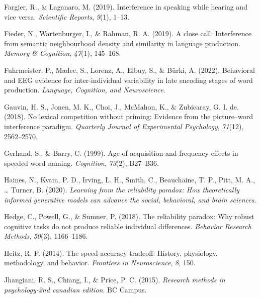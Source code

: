 \documentclass[
  man,floatsintext]{apa6}
\newlength{\cslhangindent}
\newlength{\cslentryspacingunit} %
\newenvironment{CSLReferences}[2] %
 {%
  \setlength{\parindent}{0pt}
  \ifodd #1
  \let\oldpar\par
  \def\par{\hangindent=\cslhangindent\oldpar}
  \fi
  \setlength{\parskip}{#2\cslentryspacingunit}
 }%
 {}
\begin{document}
\begin{CSLReferences}{1}{0}
\leavevmode{}%
Fargier, R., \& Laganaro, M. (2019). Interference in speaking while hearing and vice versa. \emph{Scientific Reports}, \emph{9}(1), 1--13.

\leavevmode{}%
Fieder, N., Wartenburger, I., \& Rahman, R. A. (2019). A close call: Interference from semantic neighbourhood density and similarity in language production. \emph{Memory \& Cognition}, \emph{47}(1), 145--168.

\leavevmode{}%
Fuhrmeister, P., Madec, S., Lorenz, A., Elbuy, S., \& Bürki, A. (2022). Behavioral and EEG evidence for inter-individual variability in late encoding stages of word production. \emph{Language, Cognition, and Neuroscience}.

\leavevmode{}%
Gauvin, H. S., Jonen, M. K., Choi, J., McMahon, K., \& Zubicaray, G. I. de. (2018). No lexical competition without priming: Evidence from the picture--word interference paradigm. \emph{Quarterly Journal of Experimental Psychology}, \emph{71}(12), 2562--2570.

\leavevmode{}%
Gerhand, S., \& Barry, C. (1999). Age-of-acquisition and frequency effects in speeded word naming. \emph{Cognition}, \emph{73}(2), B27--B36.

\leavevmode{}%
Haines, N., Kvam, P. D., Irving, L. H., Smith, C., Beauchaine, T. P., Pitt, M. A., \ldots{} Turner, B. (2020). \emph{Learning from the reliability paradox: How theoretically informed generative models can advance the social, behavioral, and brain sciences}.

\leavevmode{}%
Hedge, C., Powell, G., \& Sumner, P. (2018). The reliability paradox: Why robust cognitive tasks do not produce reliable individual differences. \emph{Behavior Research Methods}, \emph{50}(3), 1166--1186.

\leavevmode{}%
Heitz, R. P. (2014). The speed-accuracy tradeoff: History, physiology, methodology, and behavior. \emph{Frontiers in Neuroscience}, \emph{8}, 150.

\leavevmode{}%
Jhangiani, R. S., Chiang, I., \& Price, P. C. (2015). \emph{Research methods in psychology-2nd canadian edition}. BC Campus.


\end{CSLReferences}
\end{document}
